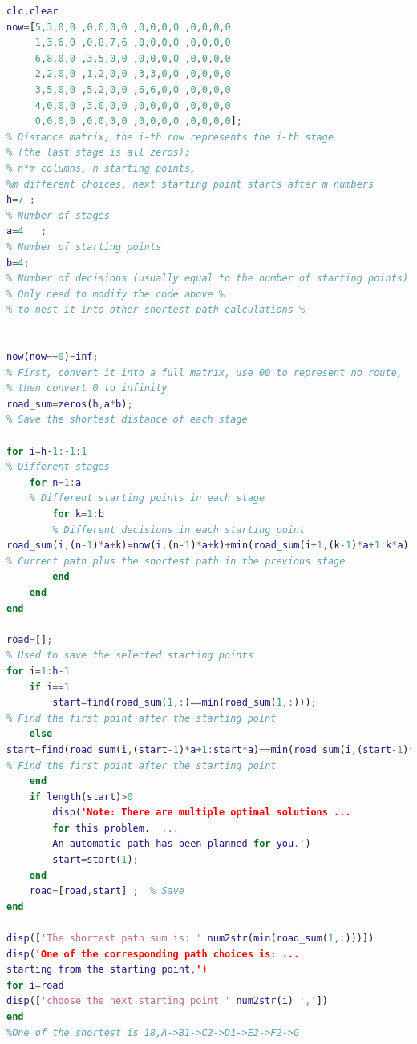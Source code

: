 \documentclass[a4paper,20pt]{article}
\begin{document}
\begin{center}
    \begin{lstlisting}[caption={Example2},language=Matlab]
        % This is Example2.m 
clc,clear 
now=[5,3,0,0 ,0,0,0,0 ,0,0,0,0 ,0,0,0,0 
     1,3,6,0 ,0,8,7,6 ,0,0,0,0 ,0,0,0,0 
     6,8,0,0 ,3,5,0,0 ,0,0,0,0 ,0,0,0,0 
     2,2,0,0 ,1,2,0,0 ,3,3,0,0 ,0,0,0,0 
     3,5,0,0 ,5,2,0,0 ,6,6,0,0 ,0,0,0,0 
     4,0,0,0 ,3,0,0,0 ,0,0,0,0 ,0,0,0,0 
     0,0,0,0 ,0,0,0,0 ,0,0,0,0 ,0,0,0,0]; 
% Distance matrix, the i-th row represents the i-th stage 
% (the last stage is all zeros); 
% n*m columns, n starting points, 
%m different choices, next starting point starts after m numbers 
h=7 ;        
% Number of stages 
a=4   ;      
% Number of starting points 
b=4;         
% Number of decisions (usually equal to the number of starting points) 
% Only need to modify the code above %
% to nest it into other shortest path calculations %
  
  
now(now==0)=inf;    
% First, convert it into a full matrix, use 00 to represent no route,
% then convert 0 to infinity 
road_sum=zeros(h,a*b);   
% Save the shortest distance of each stage 
  
for i=h-1:-1:1      
% Different stages 
    for n=1:a       
    % Different starting points in each stage 
        for k=1:b   
        % Different decisions in each starting point 
road_sum(i,(n-1)*a+k)=now(i,(n-1)*a+k)+min(road_sum(i+1,(k-1)*a+1:k*a));   
% Current path plus the shortest path in the previous stage 
        end 
    end 
end 
  
road=[];                
% Used to save the selected starting points 
for i=1:h-1 
    if i==1 
        start=find(road_sum(1,:)==min(road_sum(1,:)));       
% Find the first point after the starting point 
    else 
start=find(road_sum(i,(start-1)*a+1:start*a)==min(road_sum(i,(start-1)*a+1:start*a)));      
% Find the first point after the starting point 
    end 
    if length(start)>0 
        disp('Note: There are multiple optimal solutions ...
        for this problem.  ...
        An automatic path has been planned for you.') 
        start=start(1); 
    end 
    road=[road,start] ;  % Save 
end 
  
disp(['The shortest path sum is: ' num2str(min(road_sum(1,:)))]) 
disp('One of the corresponding path choices is: ... 
starting from the starting point,') 
for i=road 
disp(['choose the next starting point ' num2str(i) ',']) 
end
%One of the shortest is 18,A->B1->C2->D1->E2->F2->G
    \end{lstlisting}
\end{center}
\end{document}
